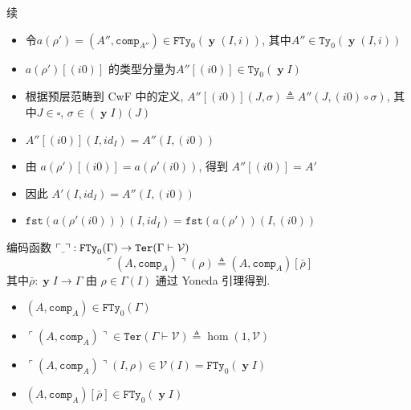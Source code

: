 \documentclass[aspectratio=169,xcolor=dvipsnames]{beamer}
\newcommand\calV{\mathcal{V}}
\newcommand\FTy{\mathtt{FTy}}
\newcommand\comp{\mathtt{comp}}
\newcommand\fst{\mathtt{fst}}
\newcommand\Ty{\mathtt{Ty}}
\newcommand\Ter{\mathtt{Ter}}
\newcommand{\ul}{{\scalebox{0.4}[1.0]{\_}}}
\DeclareMathOperator\y{\mathbf{y}}
\begin{document}
\begin{frame}{续}
  \begin{itemize}
    \item 令$a(\rho') = (A'',\comp_{A''}) \in \FTy_{0}(\y(I,i))$, 其中$A''\in\Ty_{0}(\y(I,i))$
    \item $a(\rho')[(i0)]$ 的类型分量为$A''[(i0)]\in\Ty_{0}(\y I)$
    \item 根据预层范畴到 CwF 中的定义, $A''[(i0)](J,\sigma)\triangleq A''(J,(i0)\circ\sigma)$, 其中$J\in\square$, $\sigma\in(\y I)(J)$
    \item $A''[(i0)](I,id_I) = A''(I,(i0))$
    \item 由 $a(\rho')[(i0)] = a(\rho'(i0))$, 得到 $A''[(i0)] = A'$
    \item 因此 $A'(I,id_I) = A''(I,(i0))$
    \item $\fst(a(\rho'(i0)))(I,id_I) = \fst(a(\rho'))(I,(i0))$
  \end{itemize}
\end{frame}

\begin{frame}[shrink]{编码函数}
  $\ulcorner\ul\urcorner : \FTy_{0}(\Gamma)\to\Ter(\Gamma\vdash\calV)$
  \[ \ulcorner(A,\comp_{A})\urcorner(\rho) \triangleq (A,\comp_{A})[\bar{\rho}] \]
  其中$\bar{\rho}:\y I\to\Gamma$ 由 $\rho\in\Gamma(I)$ 通过 Yoneda 引理得到.
  \begin{itemize}
    \item $(A,\comp_{A})\in\FTy_{0}(\Gamma)$
    \item $\ulcorner(A,\comp_{A})\urcorner \in \Ter(\Gamma\vdash\calV)\triangleq\hom(1,\calV)$
    \item $\ulcorner(A,\comp_{A})\urcorner(I,\rho) \in \calV(I)=\FTy_{0}(\y I)$
    \item $(A,\comp_{A})[\bar{\rho}] \in \FTy_{0}(\y I)$
  \end{itemize}
\end{frame}
\end{document}
